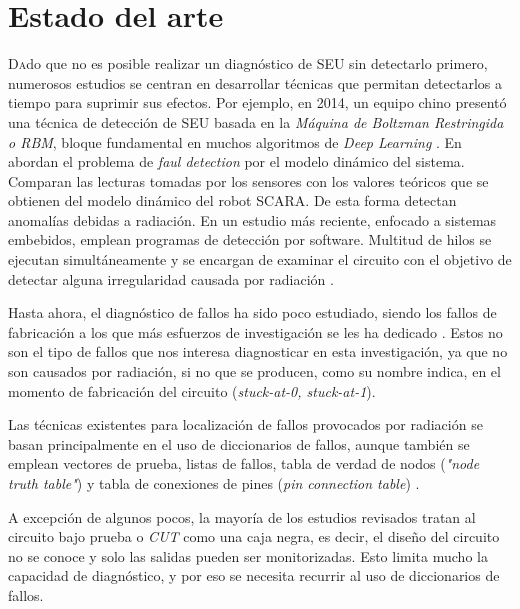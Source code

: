 \chapter{Estado del arte}
\label{ch:EstadoDelArte}

\lettrine[lraise=-0.1, lines=2, loversize=0.2]{D}{a}do que no es posible realizar
un diagnóstico de \gls{SEU} sin detectarlo primero, numerosos estudios se centran
en desarrollar técnicas que permitan detectarlos a tiempo para suprimir sus 
efectos. Por ejemplo, en 2014, un equipo chino presentó una técnica de detección 
de \gls{SEU} basada en la \textit{Máquina de Boltzman Restringida o \gls{RBM}}, 
bloque fundamental en muchos algoritmos de \textit{Deep Learning} 
\cite{RBMSEUdetection}. En \cite{SCARA} abordan el problema de \textit{faul 
detection} por el modelo dinámico del sistema. Comparan las lecturas tomadas por
los sensores con los valores teóricos que se obtienen del modelo dinámico del
robot SCARA. De esta forma detectan anomalías debidas a radiación. En un estudio
más reciente, enfocado a sistemas embebidos, emplean programas de detección por
software. Multitud de hilos se ejecutan simultáneamente y se encargan de examinar
el circuito con el objetivo de detectar alguna irregularidad causada por
radiación \cite{DetectingSEUs}.


Hasta ahora, el diagnóstico de fallos ha sido poco estudiado, siendo los fallos de
fabricación a los que más esfuerzos de investigación se les ha dedicado
\cite{VLSI, EfficientSA0SA1, RepairSA0SA1, LargeComb, ANewRep, FILC, FDIRC}.
Estos no son el tipo de fallos que nos interesa diagnosticar en esta
investigación, ya que no son causados por radiación, si no que se producen, como
su nombre indica, en el momento de fabricación del circuito (\textit{stuck-at-0,
stuck-at-1}).

Las técnicas existentes para localización de fallos provocados por radiación se
basan principalmente en el uso de diccionarios de fallos, aunque también se
emplean vectores de prueba, listas de fallos, tabla de verdad de nodos
(\textit{"node truth table"}) y tabla de conexiones de pines (\textit{pin
connection table}) \cite{DiagnosisTechniques, LASAR, RTFDandD}. 

A excepción de algunos pocos, la mayoría de los estudios revisados tratan al 
circuito bajo prueba o \textit{\gls{CUT}} como una caja negra, es decir, el diseño
del circuito no se conoce y solo las salidas pueden ser monitorizadas. Esto limita
mucho la capacidad de diagnóstico, y por eso se necesita recurrir al uso de 
diccionarios de fallos.

